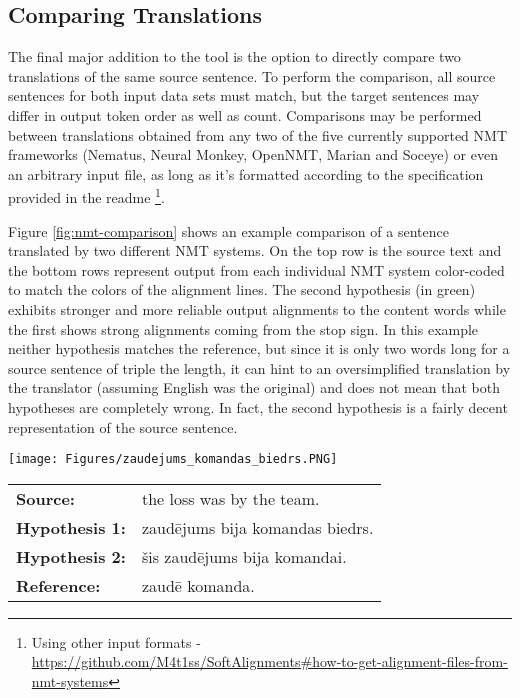 \documentclass[runningheads,a4paper]{lncs/llncs}
\begin{document}
\subsection{Comparing Translations}
\label{sec:cmp}

The final major addition to the tool is the option to directly compare two translations of the same source sentence. To perform the comparison, all source sentences for both input data sets must match, but the target sentences may differ in output token order as well as count. Comparisons may be performed between translations obtained from any two of the five currently supported NMT frameworks (Nematus, Neural Monkey, OpenNMT, Marian and Soceye) or even an arbitrary input file, as long as it's formatted according to the specification provided in the readme \footnote{Using other input formats - \url{https://github.com/M4t1ss/SoftAlignments\#how-to-get-alignment-files-from-nmt-systems}}.

Figure \ref{fig:nmt-comparison} shows an example comparison of a sentence translated by two different NMT systems. On the top row is the source text and the bottom rows represent output from each individual NMT system color-coded to match the colors of the alignment lines. The second hypothesis (in green) exhibits stronger and more reliable output alignments to the content words while the first shows strong alignments coming from the stop sign. In this example neither hypothesis matches the reference, but since it is only two words long for a source sentence of triple the length, it can hint to an oversimplified translation by the translator (assuming English was the original) and does not mean that both hypotheses are completely wrong. In fact, the second hypothesis is a fairly decent representation of the source sentence.

\begin{figure*}[t]
  \texttt{[image: Figures/zaudejums\_komandas\_biedrs.PNG]}
  \begin{tabular}{lp{10.4cm}}
   \bf Source: & the loss was by the team. \\
   \bf Hypothesis 1: & zaudējums bija komandas biedrs. \\
   \bf Hypothesis 2: & šis zaudējums bija komandai. \\
   \bf Reference: & zaudē komanda. \\
  \end{tabular}
  \caption{A direct comparison of attention alignments for translating the same sentence with two different NMT systems.}
  \label{fig:nmt-comparison}
\end{figure*}
\end{document}
